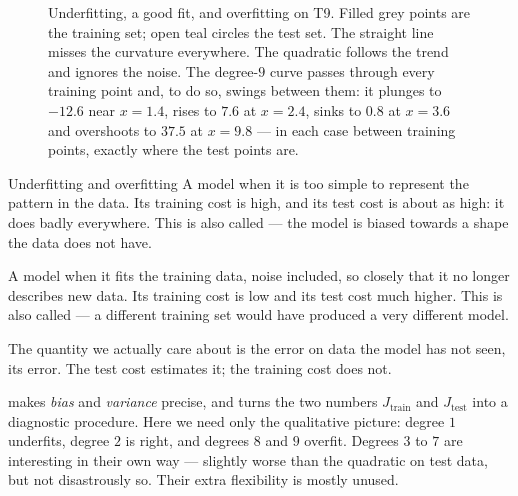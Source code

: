 \begin{figure}[htbp]
  \caption{Underfitting, a good fit, and overfitting on T9. Filled grey points
  are the training set; open teal circles the test set. The straight line
  misses the curvature everywhere. The quadratic follows the trend and ignores
  the noise. The degree-$9$ curve passes through every training point and, to
  do so, swings between them: it plunges to $-12.6$ near $x = 1.4$, rises to
  $7.6$ at $x = 2.4$, sinks to $0.8$ at $x = 3.6$ and overshoots to $37.5$ at
  $x = 9.8$ --- in each case between training points, exactly where the test
  points are.}
  \label{fig:three-fits}
\end{figure}

\begin{defbox}{Underfitting and overfitting}
A model  when it is too simple to represent the pattern in the
data. Its training cost is high, and its test cost is about as high: it does
badly everywhere. This is also called  --- the model is biased
towards a shape the data does not have.

A model  when it fits the training data, noise included, so
closely that it no longer describes new data. Its training cost is low and its
test cost much higher. This is also called  --- a different
training set would have produced a very different model.

The quantity we actually care about is the error on data the model has not
seen, its  error. The test cost estimates it; the training
cost does not.
\end{defbox}

 makes \emph{bias} and \emph{variance} precise, and turns the two
numbers $J_{\text{train}}$ and $J_{\text{test}}$ into a diagnostic procedure.
Here we need only the qualitative picture: degree $1$ underfits, degree $2$ is
right, and degrees $8$ and $9$ overfit. Degrees $3$ to $7$ are interesting in
their own way --- slightly worse than the quadratic on test data, but not
disastrously so. Their extra flexibility is mostly unused.

